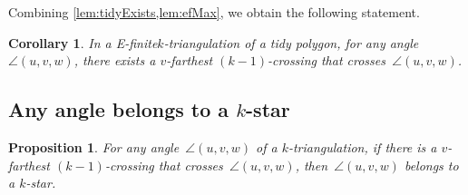\documentclass{amsart}
\newtheorem{proposition}[theorem]{Proposition}
\newtheorem{corollary}[theorem]{Corollary}
\theoremstyle{remark}
\newcommand*{\ef}[0]{E-finite\xspace}
\newcommand*{\ktg}[0]{$k$-triangulation\xspace}
\begin{document}
Combining \cref{lem:tidyExists,lem:efMax}, we obtain the following statement.

\begin{corollary}
\label{coro:farthestTidy}
In a \ef \ktg of a tidy polygon, for any angle~$\angle(u,v,w)$, there exists a $v$-farthest $(k-1)$-crossing that crosses~$\angle(u,v,w)$.
\end{corollary}


\subsection{Any angle belongs to a $k$-star}

\begin{proposition}
\label{prop:angleBelongStar}
For any angle~$\angle(u,v,w)$ of a \ktg, if there is a $v$-farthest $(k-1)$-crossing that crosses~$\angle(u,v,w)$, then~$\angle(u,v,w)$ belongs to a $k$-star.
\end{proposition}
\end{document}
